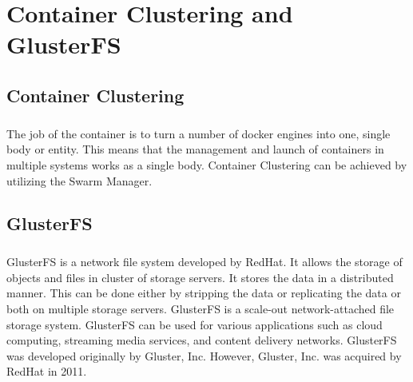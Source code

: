 \chapter{Container Clustering and GlusterFS}

\section{Container Clustering}

\paragraph{\hspace{24pt}}
The job of the container is to turn a number of docker engines into one, single body or entity. This means that the management and launch of containers in multiple systems works as a single body. Container Clustering can be achieved by utilizing the Swarm Manager.

\section{GlusterFS}

\paragraph{\hspace{24pt}}
GlusterFS is a network file system developed by RedHat. It allows the storage of objects and files in cluster of storage servers. It stores the data in a distributed manner. This can be done either by stripping the data or replicating the data or both on multiple storage servers. GlusterFS is a scale-out network-attached file storage system. GlusterFS can be used for various applications such as cloud computing, streaming media services, and content delivery networks. GlusterFS was developed originally by Gluster, Inc. However, Gluster, Inc. was acquired by RedHat in 2011.